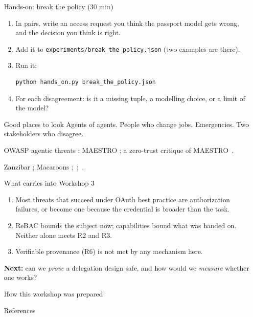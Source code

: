 \documentclass[aspectratio=169, 10pt]{beamer}
\begin{document}
\begin{frame}[fragile]{Hands-on: break the policy (30 min)}
  \small
  \begin{enumerate}
    \item In pairs, write an access request you think the passport model gets wrong, and the decision you think is right.
    \item Add it to \texttt{experiments/break\_the\_policy.json} (two examples are there).
    \item Run it:
\begin{verbatim}
python hands_on.py break_the_policy.json
\end{verbatim}
    \item For each disagreement: is it a missing tuple, a modelling choice, or a limit of the model?
  \end{enumerate}
  \begin{block}{Good places to look}\small
    Agents of agents. People who change jobs. Emergencies. Two stakeholders who disagree.
  \end{block}
\end{frame}

{OWASP agentic threats ; MAESTRO ; a zero-trust critique of MAESTRO \,\pre. }

{Zanzibar ; Macaroons ; \,\pre; \,\pre. }

\begin{frame}{What carries into Workshop 3}
  \begin{enumerate}
    \item Most threats that succeed under OAuth best practice are authorization failures, or become one because the credential is broader than the task.
    \item ReBAC bounds the subject now; capabilities bound what was handed on. Neither alone meets R2 and R3.
    \item Verifiable provenance (R6) is not met by any mechanism here.
  \end{enumerate}
  \vspace{2mm}
  \textbf{Next:} can we \emph{prove} a delegation design safe, and how would we \emph{measure} whether one works?
\end{frame}

\begin{frame}{How this workshop was prepared}
  \centering{}
\end{frame}

\begin{frame}[allowframebreaks]{References}
  \printbibliography[heading=none]
\end{frame}
\end{document}
